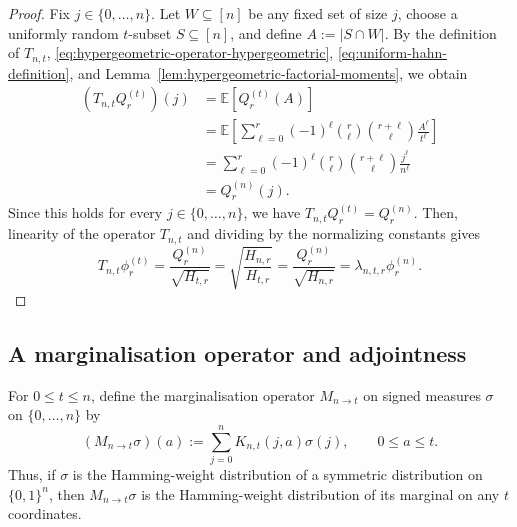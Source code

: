 \documentclass[manuscript,nonacm]{acmart}
\begin{document}
\begin{proof}
Fix \(j\in\{0,\dots,n\}\). Let \(W\subseteq[n]\) be any fixed set
of size \(j\), choose a uniformly random \(t\)-subset
\(S\subseteq[n]\), and define $A:=|S\cap W|$.
By the definition of \(T_{n,t}\), \eqref{eq:hypergeometric-operator-hypergeometric}, \eqref{eq:uniform-hahn-definition}, and
Lemma~\ref{lem:hypergeometric-factorial-moments}, we obtain
\[
\begin{aligned}
(T_{n,t}Q_r^{(t)})(j)
&=
\mathbb E\!\left[Q_r^{(t)}(A)\right] \\
&=
\mathbb E\!\left[
    \sum_{\ell=0}^r
    (-1)^\ell
    \binom r\ell
    \binom{r+\ell}{\ell}
    \frac{A^{\underline{\ell}}}{t^{\underline{\ell}}}
\right] \\
&=
\sum_{\ell=0}^r
(-1)^\ell
\binom r\ell
\binom{r+\ell}{\ell}
\frac{j^{\underline{\ell}}}{n^{\underline{\ell}}} \\
&=
Q_r^{(n)}(j).
\end{aligned}
\]
Since this holds for every \(j\in\{0,\dots,n\}\), we have $T_{n,t}Q_r^{(t)}=Q_r^{(n)}$.
Then, linearity of the operator $T_{n,t}$ and dividing by the normalizing
constants gives
\[
    T_{n,t}\phi_r^{(t)}=\frac{Q_r^{(n)}}{\sqrt{H_{t,r}}}=\sqrt{\frac{H_{n,r}}{H_{t,r}}}=\frac{Q_r^{(n)}}{\sqrt{H_{n,r}}}=\lambda_{n,t,r}\phi_r^{(n)}.
\]
\end{proof}




\subsection{A marginalisation operator and adjointness}
For \(0\le t\le n\), define the marginalisation operator
\(M_{n\to t}\) on signed measures \(\sigma\) on
\(\{0,\dots,n\}\) by
\begin{equation}
\label{eq:marginalisation-operator}
    (M_{n\to t}\sigma)(a)
    :=
    \sum_{j=0}^n
    K_{n,t}(j,a)
    \sigma(j),
    \qquad 0\le a\le t.
\end{equation}
Thus, if \(\sigma\) is the Hamming-weight distribution of a
symmetric distribution on \(\{0,1\}^n\), then
\(M_{n\to t}\sigma\) is the Hamming-weight distribution of its
marginal on any \(t\) coordinates.
\end{document}
